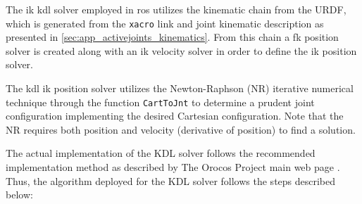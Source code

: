 The \gls{ik} \gls{kdl} solver employed in \gls{ros} utilizes the kinematic chain from the URDF, which is generated from the \texttt{xacro} link and joint kinematic description as presented in %
\autoref{sec:app_activejoints_kinematics}. From this chain %
a \gls{fk} position solver is created along with an \gls{ik} velocity solver in order to define the \gls{ik} position solver.

%
%
%

The \gls{kdl} \gls{ik} position solver utilizes the Newton-Raphson (NR) iterative numerical technique through the function \texttt{CartToJnt} to determine a prudent joint configuration implementing the desired Cartesian configuration. Note that the NR requires both position and velocity (derivative of position) to find a solution.  %

The actual implementation of the KDL solver follows the recommended implementation method as described by The Orocos Project main web page \citep{bib:kdl_stuff}.
Thus, the algorithm deployed for the KDL solver follows the steps described below:

